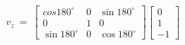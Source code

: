 \documentclass[preview]{standalone}
\begin{document}
\begin{align*}
v_z\ =\ \begin{bmatrix}
                        cos180^\circ & 0 & \sin180^\circ\\
                        0 & 1 & 0 \\
                        \sin180^\circ & 0 & \cos180^\circ
                        \end{bmatrix}\begin{bmatrix}
                        0\\
                        1\\
                        -1
                        \end{bmatrix}\\
\end{align*}
\end{document}
